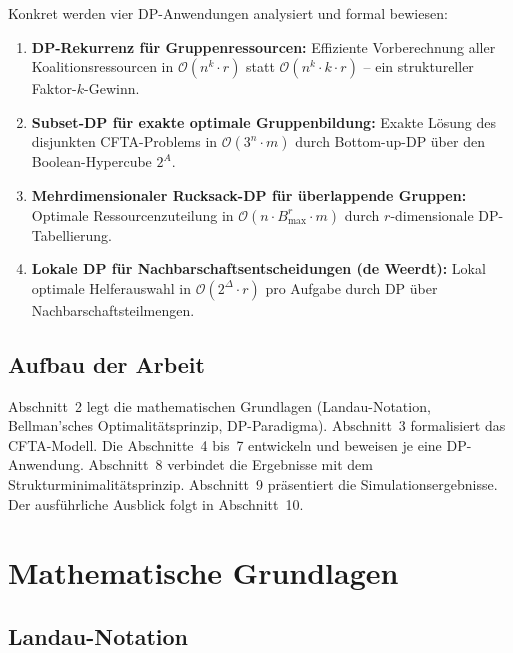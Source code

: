 \documentclass[a4paper,12pt]{article}
\theoremstyle{definition}
\begin{document}
Konkret werden vier DP-Anwendungen analysiert und formal bewiesen:
\begin{enumerate}
    \item \textbf{DP-Rekurrenz f\"{u}r Gruppenressourcen:} Effiziente
          Vorberechnung aller Koalitionsressourcen in $\mathcal{O}(n^k \cdot r)$
          statt $\mathcal{O}(n^k \cdot k \cdot r)$ -- ein struktureller
          Faktor-$k$-Gewinn.
    \item \textbf{Subset-DP f\"{u}r exakte optimale Gruppenbildung:}
          Exakte L\"{o}sung des disjunkten CFTA-Problems in $\mathcal{O}(3^n \cdot m)$
          durch Bottom-up-DP \"{u}ber den Boolean-Hypercube $2^A$.
    \item \textbf{Mehrdimensionaler Rucksack-DP f\"{u}r \"{u}berlappende Gruppen:}
          Optimale Ressourcenzuteilung in $\mathcal{O}(n \cdot B_{\max}^r \cdot m)$
          durch $r$-dimensionale DP-Tabellierung.
    \item \textbf{Lokale DP f\"{u}r Nachbarschaftsentscheidungen (de Weerdt):}
          Lokal optimale Helferauswahl in $\mathcal{O}(2^\Delta \cdot r)$ pro
          Aufgabe durch DP \"{u}ber Nachbarschaftsteilmengen.
\end{enumerate}

\subsection{Aufbau der Arbeit}

Abschnitt~2 legt die mathematischen Grundlagen (Landau-Notation, Bellman'sches
Optimalit\"{a}tsprinzip, DP-Paradigma). Abschnitt~3 formalisiert das CFTA-Modell.
Die Abschnitte~4 bis~7 entwickeln und beweisen je eine DP-Anwendung.
Abschnitt~8 verbindet die Ergebnisse mit dem Strukturminimalit\"{a}tsprinzip.
Abschnitt~9 pr\"{a}sentiert die Simulationsergebnisse. Der ausf\"{u}hrliche Ausblick
folgt in Abschnitt~10.

\section{Mathematische Grundlagen}

\subsection{Landau-Notation}
\end{document}
